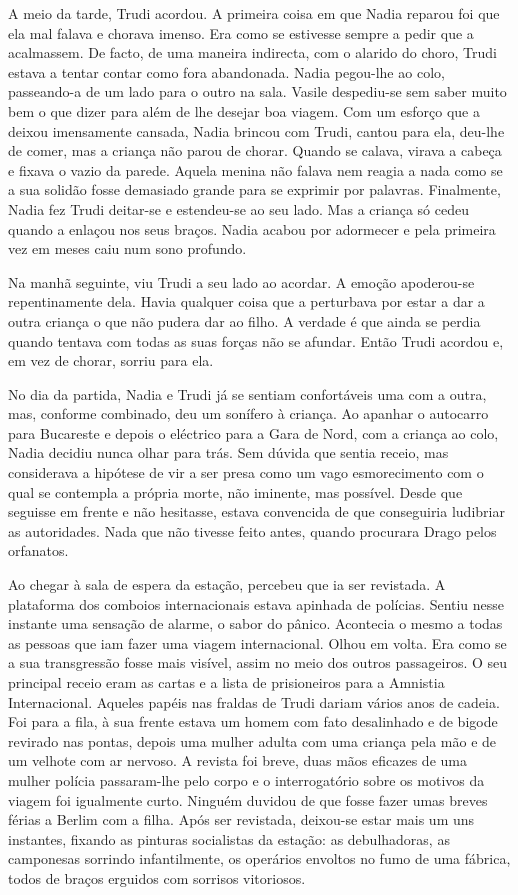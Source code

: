 A meio da tarde, Trudi acordou. A primeira coisa em
que Nadia reparou foi que ela mal falava e chorava imenso. Era como se
estivesse sempre a pedir que a acalmassem. De facto, de uma maneira
indirecta, com o alarido do choro, Trudi estava a tentar contar como
fora abandonada. Nadia pegou-lhe ao colo, passeando-a de um lado para o
outro na sala. Vasile despediu-se sem saber muito bem o que dizer para
além de lhe desejar boa viagem. Com um esforço que a deixou imensamente
cansada, Nadia brincou com Trudi, cantou para ela, deu-lhe de comer, mas
a criança não parou
de chorar. Quando se calava, virava a cabeça e fixava o vazio da parede.
Aquela menina não falava nem reagia a nada como se a sua solidão fosse
demasiado grande para se exprimir por palavras. Finalmente, Nadia fez
Trudi deitar-se e estendeu-se ao seu lado. Mas a criança só cedeu quando
a enlaçou nos seus braços. Nadia acabou por adormecer e pela primeira
vez em meses caiu num sono profundo.

Na manhã seguinte, viu Trudi a seu lado ao acordar. A emoção apoderou-se
repentinamente dela. Havia qualquer coisa que a perturbava por estar a
dar a outra criança o que não pudera dar ao filho. A verdade é que ainda
se perdia quando tentava com todas as suas forças não se afundar. Então
Trudi acordou e, em vez de chorar, sorriu para ela.

No dia da partida, Nadia e Trudi já se sentiam confortáveis uma com a
outra, mas, conforme combinado, deu um sonífero à criança. Ao apanhar o
autocarro para Bucareste e depois o eléctrico para a Gara de Nord, com
a criança ao colo, Nadia decidiu nunca olhar para trás. Sem dúvida que
sentia receio, mas considerava a hipótese de vir a ser presa como um
vago esmorecimento com o qual se contempla a própria morte, não
iminente, mas possível. Desde que seguisse em frente e não hesitasse,
estava convencida de que conseguiria ludibriar as autoridades. Nada
que não tivesse feito antes, quando procurara Drago pelos orfanatos.

Ao chegar à sala de espera da estação, percebeu que ia ser revistada. A
plataforma dos comboios internacionais
estava apinhada de polícias. Sentiu nesse instante uma sensação de
alarme, o sabor do pânico. Acontecia o mesmo a todas as pessoas que iam
fazer uma viagem internacional. Olhou em volta. Era como se a sua
transgressão fosse mais visível, assim no meio dos outros passageiros. O
seu principal receio eram as cartas e a lista de prisioneiros para a
Amnistia Internacional. Aqueles papéis nas fraldas de Trudi dariam
vários anos de cadeia. Foi para a fila, à sua frente estava um homem com
fato desalinhado e de bigode revirado nas pontas, depois uma mulher
adulta com uma criança pela mão e de um velhote com ar nervoso. A
revista foi breve, duas mãos eficazes de uma mulher polícia passaram-lhe
pelo corpo e o interrogatório sobre os motivos da viagem foi
igualmente curto. Ninguém duvidou de que fosse fazer umas breves férias
a Berlim com a filha. Após ser revistada, deixou-se estar mais um uns
instantes, fixando as pinturas socialistas da estação: as debulhadoras, as camponesas sorrindo infantilmente, os operários envoltos no fumo
de uma fábrica, todos de braços erguidos com sorrisos vitoriosos.

